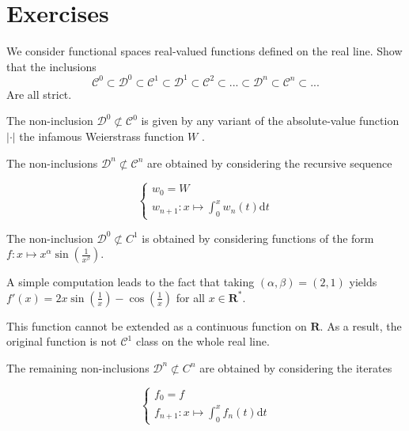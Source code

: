 \section{Exercises}

\begin{exercise}
    We consider functional spaces real-valued functions defined on the real line.
    Show that the inclusions
        \[
            \mathcal C^0 \subset \mathcal D^0 \subset \mathcal C^1 \subset \mathcal D^1 \subset \mathcal C^2 \subset ... \subset \mathcal D^n \subset \mathcal C^n \subset ...
        \]
    Are all strict.
\end{exercise}

\begin{solution}
    The non-inclusion $ \mathcal D^0 \not\subset \mathcal C^0 $ is given by any variant of the absolute-value function $ | \cdot | $ the infamous Weierstrass function $ W $ \cite{weierstrassfunction}.

    The non-inclusions $ \mathcal D^n \not\subset \mathcal C^n $ are obtained by considering the recursive sequence

    \[
        \left\{
            \begin{array}{c}
                w_0 = W \\
                w_{n+1} : x \mapsto \int_0^x w_n(t) \mathrm d t
            \end{array}
        \right.
    \]

    The non-inclusion $ \mathcal D^0 \not\subset C^1 $ is obtained by considering functions of the form $ f : x \mapsto x^\alpha \sin(\frac{1}{x^\beta}) $.

    A simple computation leads to the fact that taking $ (\alpha, \beta) = (2,1) $ yields $ f'(x) = 2x \sin(\frac 1 x) - \cos(\frac 1 x) $ for all $ x \in \mathbf R^* $.

    This function cannot be extended as a continuous function on $ \mathbf R $. As a result, the original function is not $ \mathcal C^1 $ class on the whole real line.

    The remaining non-inclusions $ \mathcal D^n \not\subset C^n $ are obtained by considering the iterates

    \[
        \left\{
            \begin{array}{c}
                f_0 = f \\
                f_{n+1} : x \mapsto \int_0^x f_n(t) \mathrm d t
            \end{array}
        \right.
    \]
\end{solution}